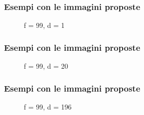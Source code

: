 \documentclass{beamer}
\begin{document}
\begin{frame}
	\frametitle{Esempi con le immagini proposte}
	\begin{figure}
		\caption{f = 99, d = 1}
	\end{figure}

\end{frame}	

\begin{frame}
	\frametitle{Esempi con le immagini proposte}
	\begin{figure}
		\caption{f = 99, d = 20}		
	\end{figure}
	
\end{frame}

\begin{frame}
	\frametitle{Esempi con le immagini proposte}
	\begin{figure}
		\caption{f = 99, d = 196}
	\end{figure}
	
\end{frame}
\end{document}
